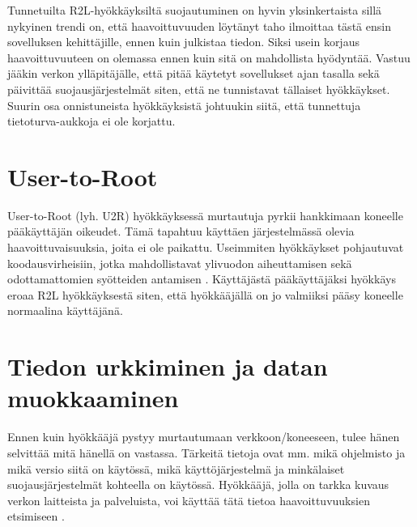 Tunnetuilta R2L-hyökkäyksiltä suojautuminen on hyvin yksinkertaista
sillä nykyinen trendi on, että haavoittuvuuden löytänyt taho ilmoittaa
tästä ensin sovelluksen kehittäjille, ennen kuin julkistaa
tiedon. Siksi usein korjaus haavoittuvuuteen on olemassa ennen kuin
sitä on mahdollista hyödyntää\cite{effect}. Vastuu jääkin verkon ylläpitäjälle,
että pitää käytetyt sovellukset ajan tasalla sekä päivittää
suojausjärjestelmät siten, että ne tunnistavat tällaiset
hyökkäykset. Suurin osa onnistuneista hyökkäyksistä johtuukin siitä,
että tunnettuja tietoturva-aukkoja ei ole korjattu.

\section{User-to-Root}

User-to-Root (lyh. U2R) hyökkäyksessä murtautuja pyrkii hankkimaan
koneelle pääkäyttäjän oikeudet. Tämä tapahtuu käyttäen järjestelmässä
olevia haavoittuvaisuuksia, joita ei ole paikattu. Useimmiten
hyökkäykset pohjautuvat koodausvirheisiin, jotka mahdollistavat
ylivuodon aiheuttamisen sekä odottamattomien syötteiden antamisen
\cite{intru}. Käyttäjästä pääkäyttäjäksi hyökkäys eroaa R2L hyökkäyksestä
siten, että hyökkääjällä on jo valmiiksi pääsy koneelle normaalina
käyttäjänä.

\section{Tiedon urkkiminen ja datan muokkaaminen}

Ennen kuin hyökkääjä pystyy murtautumaan verkkoon/koneeseen, tulee
hänen selvittää mitä hänellä on vastassa. Tärkeitä tietoja ovat
mm. mikä ohjelmisto ja mikä versio siitä on käytössä, mikä
käyttöjärjestelmä ja minkälaiset suojausjärjestelmät kohteella on
käytössä. Hyökkääjä, jolla on tarkka kuvaus verkon laitteista ja
palveluista, voi käyttää tätä tietoa haavoittuvuuksien etsimiseen \cite{intru}.

